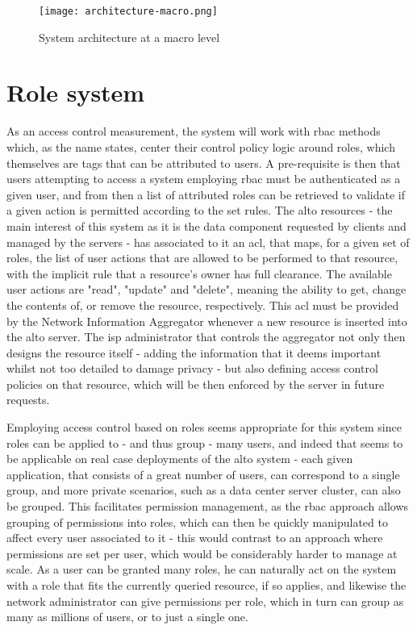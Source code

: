 \begin{figure}[H]
        \centering
        \hspace*{-4em}
        \texttt{[image: architecture-macro.png]}
        \caption{System architecture at a macro level}
        \label{fig:macro-architecture}
\end{figure}

\section{Role system}
\label{sec:system-roles}

    As an access control measurement, the system will work with \gls{rbac} methods which, as the name states, center their control policy logic around roles, which themselves are tags that can be attributed to users.
    A pre-requisite is then that users attempting to access a system employing \gls{rbac} must be authenticated as a given user, and from then a list of attributed roles can be retrieved to validate if a given action is permitted according to the set rules.
    The \gls{alto} resources - the main interest of this system as it is the data component requested by clients and managed by the servers - has associated to it an \gls{acl}, that maps, for a given set of roles, the list of user actions that are allowed to be performed to that resource, with the implicit rule that a resource's owner has full clearance.
    The available user actions are "read", "update" and "delete", meaning the ability to get, change the contents of, or remove the resource, respectively.
    This \gls{acl} must be provided by the Network Information Aggregator whenever a new resource is inserted into the \gls{alto} server.
    The \gls{isp} administrator that controls the aggregator not only then designs the resource itself - adding the information that it deems important whilst not too detailed to damage privacy - but also defining access control policies on that resource, which will be then enforced by the server in future requests.

    Employing access control based on roles seems appropriate for this system since roles can be applied to - and thus group - many users, and indeed that seems to be applicable on real case deployments of the \gls{alto} system - each given application, that consists of a great number of users, can correspond to a single group, and more private scenarios, such as a data center server cluster, can also be grouped.
    This facilitates permission management, as the \gls{rbac} approach allows grouping of permissions into roles, which can then be quickly manipulated to affect every user associated to it - this would contrast to an approach where permissions are set per user, which would be considerably harder to manage at scale.
    As a user can be granted many roles, he can naturally act on the system with a role that fits the currently queried resource, if so applies, and likewise the network administrator can give permissions per role, which in turn can group as many as millions of users, or to just a single one.

